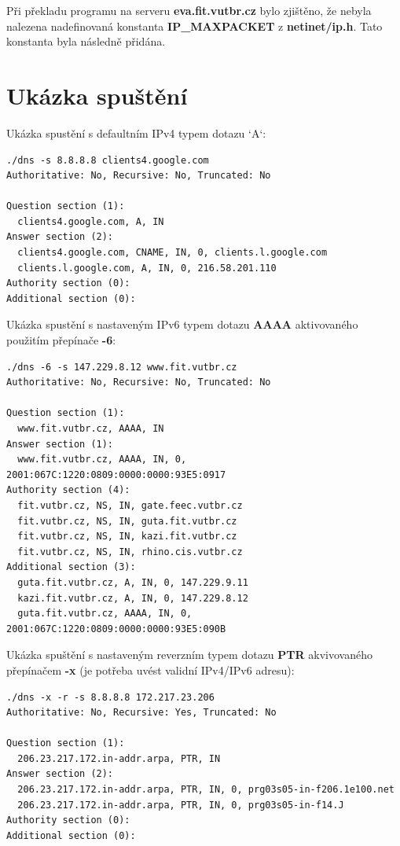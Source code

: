 \documentclass[a4paper,11pt]{article}
\begin{document}
Při překladu programu na serveru \textbf{eva.fit.vutbr.cz} bylo zjištěno, že nebyla nalezena nadefinovaná konstanta \textbf{IP\_MAXPACKET} z \textbf{netinet/ip.h}. Tato konstanta byla následně přidána.

\newpage

\section{Ukázka spuštění}

Ukázka spustění s defaultním IPv4 typem dotazu `A`:

\begin{lstlisting}[frame=single,breaklines]
./dns -s 8.8.8.8 clients4.google.com
Authoritative: No, Recursive: No, Truncated: No

Question section (1):
  clients4.google.com, A, IN
Answer section (2):
  clients4.google.com, CNAME, IN, 0, clients.l.google.com
  clients.l.google.com, A, IN, 0, 216.58.201.110
Authority section (0):
Additional section (0):
\end{lstlisting}

Ukázka spustění s nastaveným IPv6 typem dotazu \textbf{AAAA} aktivovaného použitím přepínače \textbf{-6}:

\begin{lstlisting}[frame=single,breaklines]
./dns -6 -s 147.229.8.12 www.fit.vutbr.cz
Authoritative: No, Recursive: No, Truncated: No

Question section (1):
  www.fit.vutbr.cz, AAAA, IN
Answer section (1):
  www.fit.vutbr.cz, AAAA, IN, 0, 2001:067C:1220:0809:0000:0000:93E5:0917
Authority section (4):
  fit.vutbr.cz, NS, IN, gate.feec.vutbr.cz
  fit.vutbr.cz, NS, IN, guta.fit.vutbr.cz
  fit.vutbr.cz, NS, IN, kazi.fit.vutbr.cz
  fit.vutbr.cz, NS, IN, rhino.cis.vutbr.cz
Additional section (3):
  guta.fit.vutbr.cz, A, IN, 0, 147.229.9.11
  kazi.fit.vutbr.cz, A, IN, 0, 147.229.8.12
  guta.fit.vutbr.cz, AAAA, IN, 0, 2001:067C:1220:0809:0000:0000:93E5:090B
\end{lstlisting}

Ukázka spuštění s nastaveným reverzním typem dotazu \textbf{PTR} akvivovaného přepínačem \textbf{-x} (je potřeba uvést validní IPv4/IPv6 adresu):

\begin{lstlisting}[frame=single,breaklines]
./dns -x -r -s 8.8.8.8 172.217.23.206
Authoritative: No, Recursive: Yes, Truncated: No

Question section (1):
  206.23.217.172.in-addr.arpa, PTR, IN
Answer section (2):
  206.23.217.172.in-addr.arpa, PTR, IN, 0, prg03s05-in-f206.1e100.net
  206.23.217.172.in-addr.arpa, PTR, IN, 0, prg03s05-in-f14.J
Authority section (0):
Additional section (0):
\end{lstlisting}
\end{document}
